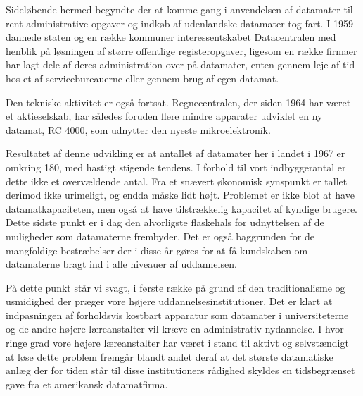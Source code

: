 {Sideløbende hermed begyndte der at komme gang i anvendelsen af datamater til rent administrative opgaver og indkøb af udenlandske datamater tog fart. I 1959 dannede staten og en række kommuner interessentskabet Datacentralen med henblik på løsningen af større offentlige registeropgaver, ligesom en række firmaer har lagt dele af deres administration over på 
datamater, enten gennem leje af tid hos et af servicebureauerne eller gennem brug af egen datamat. 

Den tekniske aktivitet er også fortsat. Regnecentralen, der siden 1964 har været et aktieselskab, har således foruden flere mindre apparater udviklet en ny datamat, RC 4000, som udnytter den nyeste mikroelektronik. 

Resultatet af denne udvikling er at antallet af datamater her i landet i 1967 er omkring 180, med hastigt stigende tendens. I forhold til vort indbyggerantal er dette ikke et overvældende antal. Fra et snævert økonomisk synspunkt er tallet derimod ikke urimeligt, og endda måske lidt højt. Problemet er ikke blot at have datamatkapaciteten, men også at have tilstrækkelig kapacitet af kyndige brugere. Dette sidste punkt er i dag den alvorligste flaskehals for udnyttelsen af de muligheder som datamaterne frembyder. Det er også baggrunden for de mangfoldige bestræbelser der i disse år gøres for at få kundskaben om datamaterne bragt ind i alle niveauer af uddannelsen. 

På dette punkt står vi svagt, i første række på grund af den traditionalisme og usmidighed der præger vore højere uddannelsesinstitutioner. Det er klart at indpasningen af forholdsvis kostbart apparatur som datamater i universiteterne og de andre højere læreanstalter vil kræve en administrativ nydannelse. I hvor ringe grad vore højere læreanstalter har været i stand til aktivt og selvstændigt at løse dette problem fremgår blandt andet deraf at det største datamatiske anlæg der for tiden står til disse institutioners rådighed skyldes en tidsbegrænset gave fra et amerikansk datamatfirma. 

}

